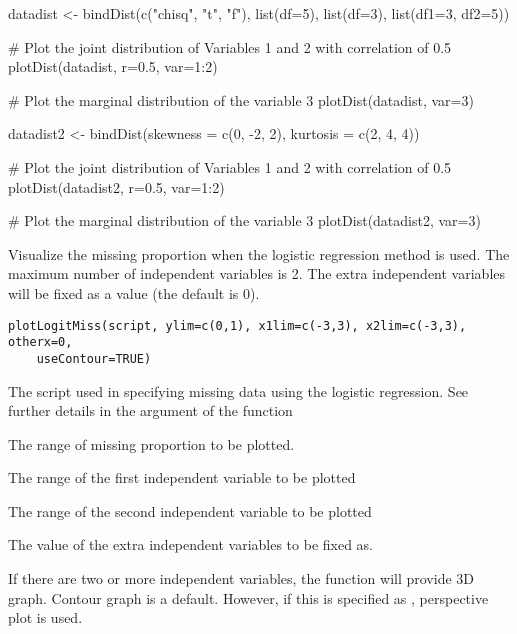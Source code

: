 \documentclass[a4paper]{book}
\begin{document}
%
\begin{Examples}
\begin{ExampleCode}
datadist <- bindDist(c("chisq", "t", "f"), list(df=5), list(df=3), list(df1=3, df2=5))

# Plot the joint distribution of Variables 1 and 2 with correlation of 0.5
plotDist(datadist, r=0.5, var=1:2)

# Plot the marginal distribution of the variable 3
plotDist(datadist, var=3)

datadist2 <- bindDist(skewness = c(0, -2, 2), kurtosis = c(2, 4, 4))

# Plot the joint distribution of Variables 1 and 2 with correlation of 0.5
plotDist(datadist2, r=0.5, var=1:2)

# Plot the marginal distribution of the variable 3
plotDist(datadist2, var=3)
\end{ExampleCode}
\end{Examples}
%
\begin{Description}\relax
Visualize the missing proportion when the logistic regression method is used. The maximum number of independent variables is 2. The extra independent variables will be fixed as a value (the default is 0).
\end{Description}
%
\begin{Usage}
\begin{verbatim}
plotLogitMiss(script, ylim=c(0,1), x1lim=c(-3,3), x2lim=c(-3,3), otherx=0, 
	useContour=TRUE)
\end{verbatim}
\end{Usage}
%
\begin{Arguments}
\begin{ldescription}
\item[\code{script}] 
The script used in specifying missing data using the logistic regression. See further details in the  argument of the  function

\item[\code{ylim}] 
The range of missing proportion to be plotted.

\item[\code{x1lim}] 
The range of the first independent variable to be plotted

\item[\code{x2lim}] 
The range of the second independent variable to be plotted

\item[\code{otherx}] 
The value of the extra independent variables to be fixed as.

\item[\code{useContour}] 
If there are two or more independent variables, the function will provide 3D graph. Contour graph is a default. However, if this is specified as , perspective plot is used.

\end{ldescription}
\end{Arguments}
\end{document}

